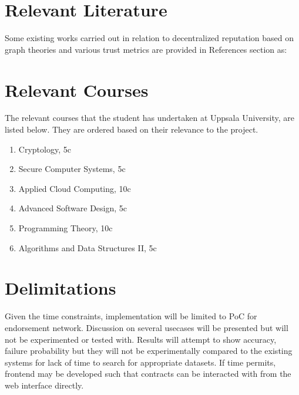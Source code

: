 \documentclass[a4paper,11pt,dvipsnames]{article}
\begin{document}
	\section*{Relevant Literature}
	Some existing works carried out in relation to decentralized reputation 
	based on graph theories and various trust metrics are provided in 
	References section as:
	\cite{literature1} \cite{literature2} \cite{ilprints562}

	\section*{Relevant Courses}
	The relevant courses that the student has undertaken at Uppsala University, 
	are listed below. They are ordered based on their relevance to the project.
	\begin{enumerate}
		\item Cryptology, 5c
		\item Secure Computer Systems, 5c
		\item Applied Cloud Computing, 10c
		\item Advanced Software Design, 5c
		\item Programming Theory, 10c
		\item Algorithms and Data Structures II, 5c
	\end{enumerate}

	\section*{Delimitations}
	Given the time constraints, implementation will be limited to PoC for 
	endorsement network. Discussion on several usecases will be presented 
	but will not be experimented or tested with. Results will attempt to show 
	accuracy, failure probability but they will not be experimentally compared 
	to the existing systems for lack of time to search for appropriate datasets.
	If time permits, frontend may be developed such that contracts can be 
	interacted with from the web interface directly.
	
\end{document}
